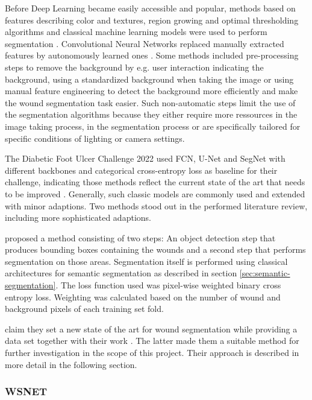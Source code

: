 Before Deep Learning became easily accessible and popular, methods based on features describing color and textures, region growing and optimal thresholding algorithms and classical machine learning models were used to perform segmentation \cite{Scebba2022}. Convolutional Neural Networks replaced manually extracted features by autonomously learned ones \cite{Scebba2022}. Some methods included pre-processing steps to remove the background by e.g. user interaction indicating the background, using a standardized background when taking the image or using manual feature engineering to detect the background more efficiently and make the wound segmentation task easier. Such non-automatic steps limit the use of the segmentation algorithms because they either require more ressources in the image taking process, in the segmentation process or are specifically tailored for specific conditions of lighting or camera settings.

The Diabetic Foot Ulcer Challenge 2022 used FCN, U-Net and SegNet with different backbones and categorical cross-entropy loss as baseline for their challenge, indicating those methods reflect the current state of the art that needs to be improved \cite{DFUC2022}. Generally, such classic models are commonly used and extended with minor adaptions. Two methods stood out in the performed literature review, including more sophisticated adaptions.

\citeauthor{Scebba2022} proposed a method consisting of two steps: An object detection step that produces bounding boxes containing the wounds and a second step that performs segmentation on those areas. Segmentation itself is performed using classical architectures for semantic segmentation as described in section \ref{sec:semantic-segmentation}. The loss function used was pixel-wise weighted binary cross entropy loss. Weighting was calculated based on the number of wound and background pixels of each training set fold.

\citeauthor{Oota_2023_WACV} claim they set a new state of the art for wound segmentation while providing a data set together with their work \cite{Oota_2023_WACV}. The latter made them a suitable method for further investigation in the scope of this project. Their approach is described in more detail in the following section.

\subsubsection{WSNET}


